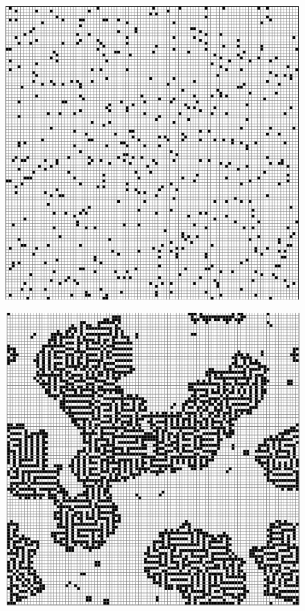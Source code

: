 \documentclass[12pt] {article}
\begin{document}
\begin{figure}[H]
    \begin{minipage}[t]{.3\textwidth}
        \centering
        \includegraphics[width=\textwidth]{res/lab_1.png}
        \label{fig:lab1}
    \end{minipage}
    \hfill
    \begin{minipage}[t]{.3\textwidth}
        \centering
        \includegraphics[width=\textwidth]{res/lab_31.png}

\end{minipage}
\end{figure}
\end{document}
